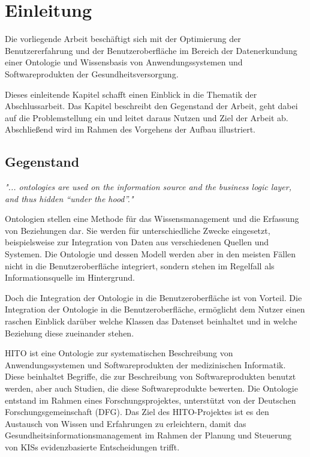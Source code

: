\chapter{Einleitung}\label{ch:introduction}

Die vorliegende Arbeit beschäftigt sich mit der Optimierung der Benutzererfahrung und der Benutzeroberfläche im Bereich der Datenerkundung einer Ontologie und Wissensbasis von Anwendungssystemen und Softwareprodukten der Gesundheitsversorgung.

Dieses einleitende Kapitel schafft einen Einblick in die Thematik der Abschlussarbeit. 
Das Kapitel beschreibt den Gegenstand der Arbeit, geht dabei auf die Problemstellung ein und leitet daraus Nutzen und Ziel der Arbeit ab.
Abschließend wird im Rahmen des Vorgehens der Aufbau illustriert.

\section{Gegenstand}\label{sec:gegenstand}

\begin{center}
\textit{"... ontologies are used on the information source and the business logic layer, and thus hidden “under the hood”."}
\end{center}

\begin{flushright}
\textit{ \textendash{} \citep{paulheim2010ontology}} \newline
\end{flushright}

Ontologien stellen eine Methode für das Wissensmanagement und die Erfassung von Beziehungen dar.
Sie werden für unterschiedliche Zwecke eingesetzt, beispielsweise zur Integration von Daten aus verschiedenen Quellen und Systemen.
Die Ontologie und dessen Modell werden aber in den meisten Fällen nicht in die Benutzeroberfläche integriert, sondern stehen im Regelfall als Informationsquelle im Hintergrund. \citep[vgl.]{paulheim2010ontology}

Doch die Integration der Ontologie in die Benutzeroberfläche ist von Vorteil. 
Die Integration der Ontologie in die Benutzeroberfläche, ermöglicht dem Nutzer einen raschen Einblick darüber welche Klassen das Datenset beinhaltet und in welche Beziehung diese zueinander stehen. \citep[vgl.]{linkeddatavisualization}

\ac{HITO} ist eine Ontologie zur systematischen Beschreibung von Anwendungssystemen und Softwareprodukten der medizinischen Informatik.
Diese beinhaltet Begriffe, die zur Beschreibung von Softwareprodukten benutzt werden, aber auch Studien, die diese Softwareprodukte bewerten.
Die Ontologie entstand im Rahmen eines Forschungsprojektes, unterstützt von der Deutschen Forschungsgemeinschaft (\ac{DFG}).
Das Ziel des HITO-Projektes ist es den Austausch von Wissen und Erfahrungen zu erleichtern, damit das Gesundheitsinformationsmanagement im Rahmen der Planung und Steuerung von \acp{KIS} evidenzbasierte Entscheidungen trifft.

